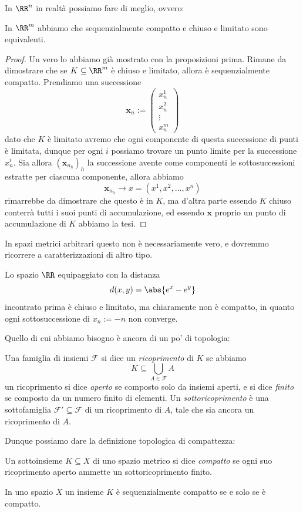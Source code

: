 \documentclass[11pt]{scrartcl}
\begin{document}
	In $\RR^n$ in realtà possiamo fare di meglio, ovvero:
	\begin{theorem}
		In $\RR^m$ abbiamo che sequenzialmente compatto e chiuso e limitato sono equivalenti.
	\end{theorem}
	\begin{proof}
		Un vero lo abbiamo già mostrato con la proposizioni prima. Rimane da dimostrare che se $K\subseteq \RR^m$ è chiuso e limitato, allora è sequenzialmente compatto. Prendiamo una successione 
		$$\mathbf{x}_n:=\begin{pmatrix}
			x_n^1 \\
			x_n^2 \\
			\vdots \\
			x_n^m
		\end{pmatrix}$$ 
		dato che $K$ è limitato avremo che ogni componente di questa successione di punti è limitata, dunque per ogni $i$ possiamo trovare un punto limite per la successione $x_n^i$. Sia allora $\left(\mathbf{x}_{n_h}\right)_h$ la successione avente come componenti le sottosuccessioni estratte per ciascuna componente, allora abbiamo
		$$\mathbf{x}_{n_h}\to x=\left(x^1,x^2,\dots,x^n\right)$$
		rimarrebbe da dimostrare che questo è in $K$, ma d'altra parte essendo $K$ chiuso conterrà tutti i suoi punti di accumulazione, ed essendo $\mathbf{x}$ proprio un punto di accumulazione di $K$ abbiamo la tesi.
	\end{proof}
	In spazi metrici arbitrari questo non è necessariamente vero, e dovremmo ricorrere a caratterizzazioni di altro tipo.
	\begin{example}
		Lo spazio $\RR$ equipaggiato con la distanza
		$$d(x,y)=\abs{e^x-e^y}$$
		incontrato prima è chiuso e limitato, ma chiaramente non è compatto, in quanto ogni sottosuccessione di $x_n:=-n$ non converge.
	\end{example}
	Quello di cui abbiamo bisogno è ancora di un po' di topologia:
	\begin{definition}
		Una famiglia di insiemi $\mathcal{F}$ si dice un \textit{ricoprimento} di $K$ se abbiamo
		$$K\subseteq \bigcup_{A\in \mathcal{F}}A$$
		un ricoprimento si dice \textit{aperto} se composto solo da insiemi aperti, e si dice \textit{finito} se composto da un numero finito di elementi. Un \textit{sottoricoprimento} è una sottofamiglia $\mathcal{F}'\subseteq \mathcal{F}$ di un ricoprimento di $A$, tale che sia ancora un ricoprimento di $A$.
	\end{definition}
	Dunque possiamo dare la definizione topologica di compattezza:
	\begin{definition}
		Un sottoinsieme $K\subseteq X$ di uno spazio metrico si dice \textit{compatto} se ogni suo ricoprimento aperto ammette un sottoricoprimento finito.
	\end{definition}
	\begin{theorem}
		In uno spazio $X$ un insieme $K$ è sequenzialmente compatto se e solo se è compatto.
	\end{theorem}
\end{document}
